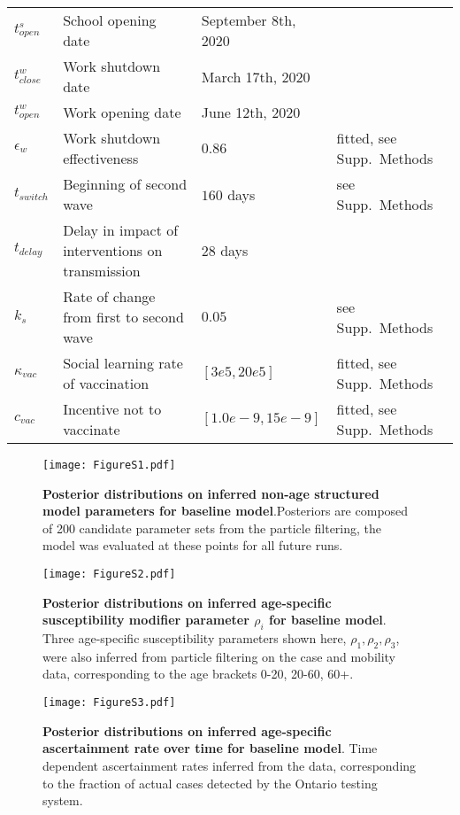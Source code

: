 \documentclass[10pt,onecolumn,twoside,lineno]{pnas-new}
\begin{document}
\begin{table}[H]
\begin{tabular}{llll}
$ t^s_{open} $ & School opening date & September 8th, 2020 &  \cite{school_opening} \\
$ t^w_{close} $ &   Work shutdown date & March 17th, 2020 & \cite{ontario_reopening}\\
$ t^w_{open}  $ & Work opening date &  June 12th, 2020 & \cite{ontario_reopening}\\
$ \epsilon_w $ & Work shutdown effectiveness & $0.86$ & fitted, see Supp.~Methods \\
$ t_{switch} $ & Beginning of second wave & $160 $ days &  see Supp.~Methods \\ 
$ t_{delay} $ & Delay in impact of interventions on transmission & $28$ days &  \cite{li2020temporal} \\ 
$k_s$ & Rate of change from first to second wave & $0.05$ &  see Supp.~Methods \\ 
$ \kappa_{vac}$ & Social learning rate of vaccination & $[3e5,20e5] $& fitted, see Supp.~Methods \\
$ c_{vac}$ & Incentive not to vaccinate & $[1.0e-9,15e-9]$& fitted, see Supp.~Methods \\
\bottomrule  
\end{tabular}
\label{tab:params}
\end{table}

\clearpage 

\begin{figure}[H]
\centering
\texttt{[image: FigureS1.pdf]}
\caption{\textbf{Posterior distributions on inferred non-age structured model parameters for baseline model}.Posteriors are composed of 200 candidate parameter sets from the particle filtering, the model was evaluated at these points for all future runs.}
\label{plot_model}
\end{figure}

\clearpage 

\begin{figure}[H]
\centering
\texttt{[image: FigureS2.pdf]}
\caption{\textbf{Posterior distributions on inferred age-specific susceptibility modifier parameter $\rho_i$ for baseline model}. Three age-specific susceptibility parameters shown here, $\rho_1,\rho_2,\rho_3$, were also inferred from particle filtering on the case and mobility data, corresponding to the age brackets 0-20, 20-60, 60+.}
\label{plot_model}
\end{figure}

\clearpage 

\begin{figure}[H]
\centering
\texttt{[image: FigureS3.pdf]}
\caption{\textbf{Posterior distributions on inferred age-specific ascertainment rate over time for baseline model}. Time dependent ascertainment rates inferred from the data, corresponding to the fraction of actual cases detected by the Ontario testing system. }
\label{plot_model}
\end{figure}
\end{document}
